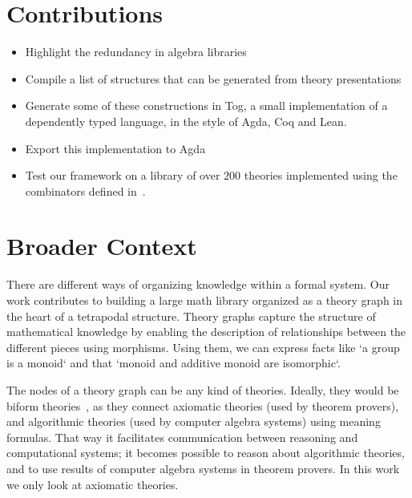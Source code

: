 


\section{Contributions}
\begin{itemize}
    \item Highlight the redundancy in algebra libraries 
    \item Compile a list of structures that can be generated from theory presentations
    \item Generate some of these constructions in Tog, a small implementation of a dependently typed language, in the style of Agda, Coq and Lean. 
    \item Export this implementation to Agda 
    \item Test our framework on a library of over $200$ theories implemented using the combinators defined in~\cite{carette2018building}. 
\end{itemize}  

\section{Broader Context}
\label{sec:broader_context}
There are different ways of organizing knowledge within a formal system. Our work contributes to building a large math library organized as a theory graph in the heart of a tetrapodal structure. Theory graphs capture the structure of mathematical knowledge by enabling the description of relationships between the different pieces using morphisms. Using them, we can express facts like `a group is a monoid` and that `monoid and additive monoid are isomorphic`. 

The nodes of a theory graph can be any kind of theories. Ideally, they would be biform theories~\cite{biformCICM2018}, as they connect axiomatic theories (used by theorem provers), and algorithmic theories (used by computer algebra systems) using meaning formulas. That way it facilitates communication between reasoning and computational systems; it becomes possible to reason about algorithmic theories, and to use results of computer algebra systems in theorem provers. In this work we only look at axiomatic theories. 

